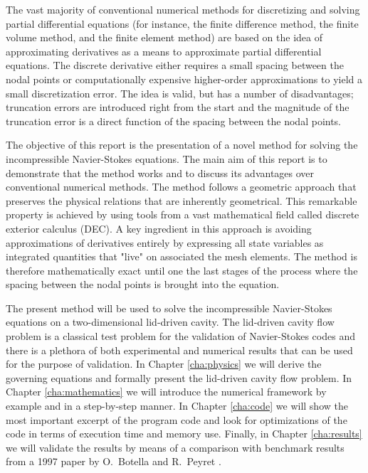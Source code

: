 The vast majority of conventional numerical methods for discretizing and solving partial differential equations (for instance, the finite difference method, the finite volume method, and the finite element method) are based on the idea of approximating derivatives as a means to approximate partial differential equations. The discrete derivative either requires a small spacing between the nodal points or computationally expensive higher-order approximations to yield a small discretization error. The idea is valid, but has a number of disadvantages; truncation errors are introduced right from the start and the magnitude of the truncation error is a direct function of the spacing between the nodal points.

The objective of this report is the presentation of a novel method for solving the incompressible Navier-Stokes equations. The main aim of this report is to demonstrate that the method works and to discuss its advantages over conventional numerical methods. The method follows a geometric approach that preserves the physical relations that are inherently geometrical. This remarkable property is achieved by using tools from a vast mathematical field called discrete exterior calculus (DEC). A key ingredient in this approach is avoiding approximations of derivatives entirely by expressing all state variables as integrated quantities that "live" on associated the mesh elements. The method is therefore mathematically exact until one the last stages of the process where the spacing between the nodal points is brought into the equation.

The present method will be used to solve the incompressible Navier-Stokes equations on a two-dimensional lid-driven cavity. The lid-driven cavity flow problem is a classical test problem for the validation of Navier-Stokes codes and there is a plethora of both experimental and numerical results that can be used for the purpose of validation. In Chapter \ref{cha:physics} we will derive the governing equations and formally present the lid-driven cavity flow problem. In Chapter \ref{cha:mathematics} we will introduce the numerical framework by example and in a step-by-step manner. In Chapter \ref{cha:code} we will show the most important excerpt of the program code and look for optimizations of the code in terms of execution time and memory use. Finally, in Chapter \ref{cha:results} we will validate the results by means of a comparison with benchmark results from a 1997 paper by O.~Botella and R.~Peyret \parencite{botella1998benchmark}.
